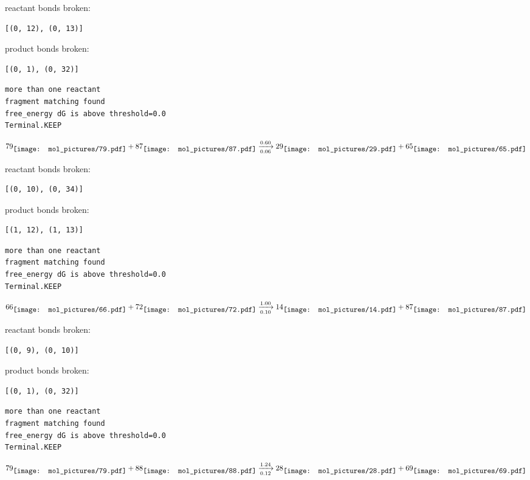 \documentclass{article}
\begin{document}
reactant bonds broken:\begin{verbatim}
[(0, 12), (0, 13)]
\end{verbatim}
product bonds broken:\begin{verbatim}
[(0, 1), (0, 32)]
\end{verbatim}




\vspace{1cm}
\begin{verbatim}
more than one reactant
fragment matching found
free_energy dG is above threshold=0.0
Terminal.KEEP
\end{verbatim}
$$
79
\raisebox{-.5\height}{\texttt{[image: mol\_pictures/79.pdf]}}
+
87
\raisebox{-.5\height}{\texttt{[image: mol\_pictures/87.pdf]}}
\xrightarrow[0.06]{0.60}
29
\raisebox{-.5\height}{\texttt{[image: mol\_pictures/29.pdf]}}
+
65
\raisebox{-.5\height}{\texttt{[image: mol\_pictures/65.pdf]}}
$$


reactant bonds broken:\begin{verbatim}
[(0, 10), (0, 34)]
\end{verbatim}
product bonds broken:\begin{verbatim}
[(1, 12), (1, 13)]
\end{verbatim}




\vspace{1cm}
\begin{verbatim}
more than one reactant
fragment matching found
free_energy dG is above threshold=0.0
Terminal.KEEP
\end{verbatim}
$$
66
\raisebox{-.5\height}{\texttt{[image: mol\_pictures/66.pdf]}}
+
72
\raisebox{-.5\height}{\texttt{[image: mol\_pictures/72.pdf]}}
\xrightarrow[0.10]{1.00}
14
\raisebox{-.5\height}{\texttt{[image: mol\_pictures/14.pdf]}}
+
87
\raisebox{-.5\height}{\texttt{[image: mol\_pictures/87.pdf]}}
$$


reactant bonds broken:\begin{verbatim}
[(0, 9), (0, 10)]
\end{verbatim}
product bonds broken:\begin{verbatim}
[(0, 1), (0, 32)]
\end{verbatim}




\vspace{1cm}
\begin{verbatim}
more than one reactant
fragment matching found
free_energy dG is above threshold=0.0
Terminal.KEEP
\end{verbatim}
$$
79
\raisebox{-.5\height}{\texttt{[image: mol\_pictures/79.pdf]}}
+
88
\raisebox{-.5\height}{\texttt{[image: mol\_pictures/88.pdf]}}
\xrightarrow[0.12]{1.24}
28
\raisebox{-.5\height}{\texttt{[image: mol\_pictures/28.pdf]}}
+
69
\raisebox{-.5\height}{\texttt{[image: mol\_pictures/69.pdf]}}
$$
\end{document}
